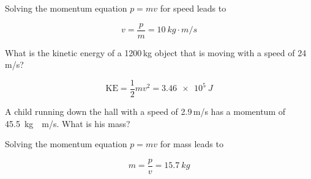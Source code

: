 \documentclass[answers]{exam}
\begin{document}
\begin{questions}
\begin{solution}
Solving the momentum equation $p = mv$ for speed leads to

\begin{equation*}
    v = \frac{p}{m} = \boxed{\SI{10}{kg\cdot m/s}}
\end{equation*}
\end{solution}


     
\question %
What is the kinetic energy of a 1200\,kg object that is moving with a speed of 24\,m/s? 

\begin{solution}
\begin{equation*}
    \mathrm{KE} = \frac{1}{2} mv^2 = \boxed{\SI{3.46e5}{J}}
\end{equation*}
\end{solution}

\question %
A child running down the hall with a speed of 2.9\,m/s has a momentum of \SI{45.5}{kg\cdot m/s}. What is his mass?

\begin{solution}
Solving the momentum equation $p = mv$ for mass leads to 

\begin{equation*}
    m = \frac{p}{v} = \boxed{\SI{15.7}{kg}}
\end{equation*}
\end{solution}







\end{questions}
\end{document}
